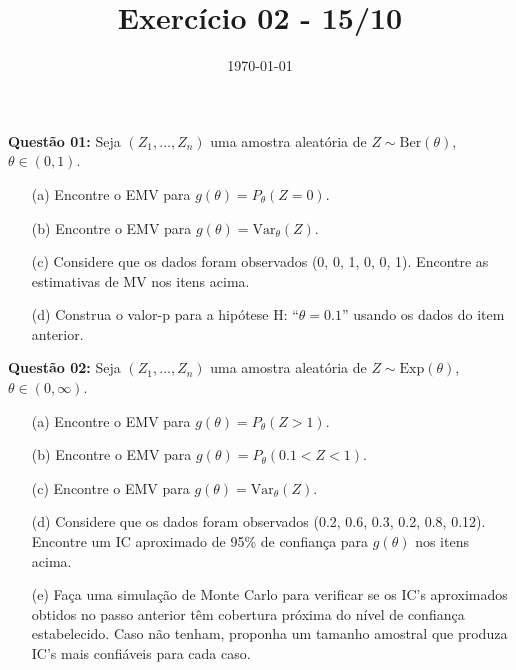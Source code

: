 \documentclass[a4paper]{article}
\date{\today}
\title{Exercício 02 - 15/10}
\begin{document}
    \header{}

\textbf{Questão 01:}  
Seja $(Z_1, \ldots, Z_n)$ uma amostra aleatória de $Z \sim \text{Ber}(\theta)$, $\theta \in (0,1)$.
\begin{itemize}
  \item[(a)] Encontre o EMV para $g(\theta) = P_\theta(Z = 0)$.
  \item[(b)] Encontre o EMV para $g(\theta) = \mathrm{Var}_\theta(Z)$.
  \item[(c)] Considere que os dados foram observados (0, 0, 1, 0, 0, 1). Encontre as estimativas de MV nos itens acima.
  \item[(d)] Construa o valor-p para a hipótese H: ``$\theta = 0.1$'' usando os dados do item anterior.
\end{itemize}
    
\begin{research}[]
 
    \end{research}

    \begin{answer}[]
 
    \end{answer}

\textbf{Questão 02:}  
Seja $(Z_1, \ldots, Z_n)$ uma amostra aleatória de $Z \sim \text{Exp}(\theta)$, $\theta \in (0,\infty)$.
\begin{itemize}
  \item[(a)] Encontre o EMV para $g(\theta) = P_\theta(Z > 1)$.
  \item[(b)] Encontre o EMV para $g(\theta) = P_\theta(0.1 < Z < 1)$.
  \item[(c)] Encontre o EMV para $g(\theta) = \mathrm{Var}_\theta(Z)$.
  \item[(d)] Considere que os dados foram observados (0.2, 0.6, 0.3, 0.2, 0.8, 0.12). Encontre um IC aproximado de 95\% de confiança para $g(\theta)$ nos itens acima.
  \item[(e)] Faça uma simulação de Monte Carlo para verificar se os IC's aproximados obtidos no passo anterior têm cobertura próxima do nível de confiança estabelecido. Caso não tenham, proponha um tamanho amostral que produza IC's mais confiáveis para cada caso.
\end{itemize}
   
\begin{research}[]
 
    \end{research}
\begin{answer}[]

    \end{answer}
\end{document}
